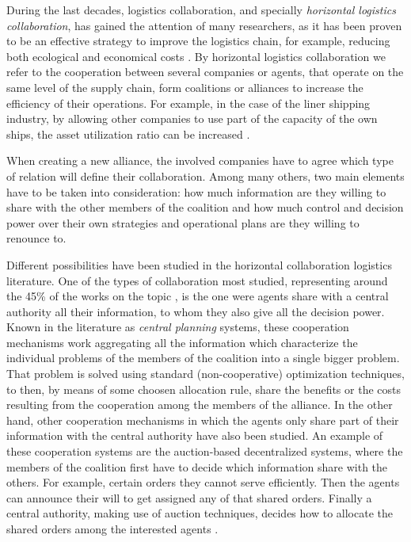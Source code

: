 \documentclass{article}
\begin{document}
During the last decades, logistics collaboration, and specially \emph{horizontal
logistics collaboration}, has gained the attention of many researchers, as it has been proven to be an effective strategy to improve the logistics chain, for example, reducing both ecological and economical costs \parencite{BALLOT2010,SOYSAL2018168}. By horizontal logistics collaboration we refer to the cooperation between several companies or agents, that operate on the same level of the supply chain, form coalitions or alliances to increase the efficiency of their operations. For example, in the case of the liner shipping industry, by allowing other companies to use part of the capacity of the own ships, the asset utilization ratio can be increased \parencite{AGARWAL2008175}.

When creating a new alliance, the involved companies have to agree which type of relation will define their collaboration. Among many others, two main elements have to be taken into consideration: how much information are they willing to share with the other members of the coalition and how much control and decision power over their own strategies and operational plans are they willing to renounce to.

Different possibilities have been studied in the horizontal collaboration logistics literature. One of the types of collaboration most studied, representing around the 45\% of the works on the topic \parencite{GANSTERER2017}, is the one were agents share with a central authority all their information, to whom they also give all the decision power. Known in the literature as \emph{central planning} systems, these cooperation mechanisms work aggregating all the information which characterize the individual problems of the members of the coalition into a single bigger problem. That problem is solved using standard (non-cooperative) optimization techniques, to then, by means of some choosen allocation rule, share the benefits or the costs resulting from the cooperation among the members of the alliance. In the other hand, other cooperation mechanisms in which the agents only share part of their information with the central authority have also been studied. An example of these cooperation systems are the auction-based decentralized systems, where the members of the coalition first have to decide which information share with the others. For example, certain orders they cannot serve efficiently. Then the agents can announce their will to get assigned any of that shared orders. Finally a central authority, making use of auction techniques, decides how to allocate the shared orders among the interested agents \parencite{VERDONCK2013}. 
\end{document}
